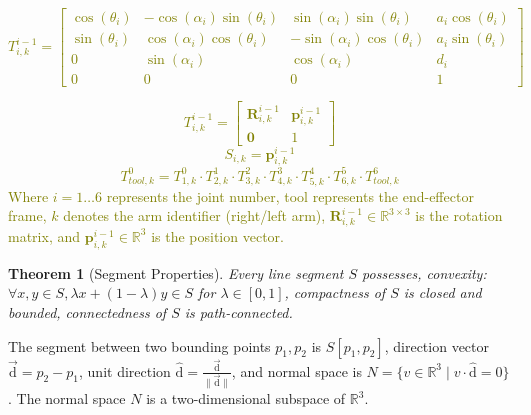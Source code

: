 \documentclass[utf8]{FrontiersinHarvard}
\newtheorem{theorem}{Theorem}
\begin{document}
\textcolor{olive}{
\begin{equation}
    T^{i-1}_{i,k} = \begin{bmatrix}
    \cos(\theta_i) & -\cos(\alpha_i)\sin(\theta_i) & \sin(\alpha_i)\sin(\theta_i) &     a_i\cos(\theta_i) \\
    \sin(\theta_i) & \cos(\alpha_i)\cos(\theta_i) & -\sin(\alpha_i)\cos(\theta_i) &     a_i\sin(\theta_i) \\
    0 & \sin(\alpha_i) & \cos(\alpha_i) & d_i \\
    0 & 0 & 0 & 1
    \end{bmatrix}
    \label{forward_kin_eq}
\end{equation}}

\textcolor{olive}{
\begin{equation}
    T^{i-1}_{i,k} = \begin{bmatrix}
    \mathbf{R}_{i,k}^{i-1} & \mathbf{p}_{i,k}^{i-1} \\
    \mathbf{0} & 1
    \end{bmatrix}
    \label{transformation_matrix}
\end{equation}}
\textcolor{olive}{
\begin{equation}
    S_{i,k} = \mathbf{p}_{i,k}^{i-1}
    \label{segment_equation}
\end{equation}}
\textcolor{olive}{
\begin{equation}
    T^0_{tool,k} = T^0_{1,k} \cdot T^1_{2,k} \cdot T^2_{3,k} \cdot T^3_{4,k} \cdot T^4_{5,k} \cdot T^5_{6,k} \cdot T^6_{tool,k}
    \label{fwdeq}
\end{equation}}
\textcolor{olive}{Where $i = 1 \dots 6$ represents the joint number, tool represents the end-effector frame, $k$ denotes the arm identifier (right/left arm), \( \mathbf{R}_{i,k}^{i-1} \in \mathbb{R}^{3 \times 3} \) is the rotation matrix, and \( \mathbf{p}_{i,k}^{i-1} \in \mathbb{R}^3 \) is the position vector.}

\begin{theorem}[Segment Properties]
Every line segment $S$ possesses, convexity: $\forall x,y \in S, \lambda x + (1-\lambda)y \in S$ for $\lambda \in [0,1]$, compactness of $S$ is closed and bounded, connectedness of $S$ is path-connected. \citet{munkrestopology}
\end{theorem}
\noindent The segment between two bounding points $p_{1}, p_{2}$ is $S[p_1,p_2]$, direction vector $\Vec{\mathrm{d}} = p_2-p_1$, unit direction $\hat{\mathrm{d}} = \frac{\Vec{\mathrm{d}}}{\|\Vec{\mathrm{d}}\|}$, and normal space is $N = \{v \in \mathbb{R}^3 \mid v \cdot \hat{\mathrm{d}} = 0\}$. The normal space $N$ is a two-dimensional subspace of $\mathbb{R}^3$. \citet{o2006elementary}
\end{document}
